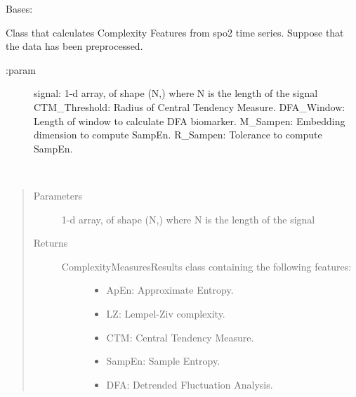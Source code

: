\documentclass[letterpaper,10pt,english]{sphinxmanual}
\begin{document}
\begin{fulllineitems}
\label{\detokenize{OBM:OBM.ComplexityMeasures.ComplexityMeasures}}
Bases: 

Class that calculates Complexity Features from spo2 time series.
Suppose that the data has been preprocessed.
\begin{description}
\item[{:param}] \leavevmode
signal: 1-d array, of shape (N,) where N is the length of the signal
CTM\_Threshold: Radius of Central Tendency Measure.
DFA\_Window: Length of window to calculate DFA biomarker.
M\_Sampen: Embedding dimension to compute SampEn.
R\_Sampen: Tolerance to compute SampEn.

\end{description}

\begin{fulllineitems}
\label{\detokenize{OBM:OBM.ComplexityMeasures.ComplexityMeasures.compute}}~\begin{quote}\begin{description}
\item[{Parameters}] \leavevmode
{} \textendash{} 1-d array, of shape (N,) where N is the length of the signal

\item[{Returns}] \leavevmode
\begin{description}
\item[{ComplexityMeasuresResults class containing the following features:}] \leavevmode\begin{itemize}
\item {} 
ApEn: Approximate Entropy.

\item {} 
LZ: Lempel-Ziv complexity.

\item {} 
CTM: Central Tendency Measure.

\item {} 
SampEn: Sample Entropy.

\item {} 
DFA: Detrended Fluctuation Analysis.

\end{itemize}

\end{description}


\end{description}\end{quote}

\end{fulllineitems}


\end{fulllineitems}
\end{document}
